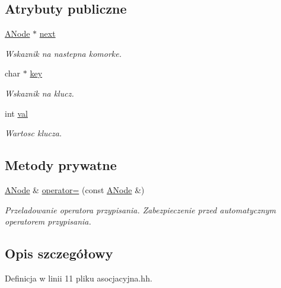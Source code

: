 \subsection*{Atrybuty publiczne}
\begin{DoxyCompactItemize}
\item 
\hyperlink{struct_a_node}{A\-Node} $\ast$ \hyperlink{struct_a_node_a97878d7354cd6beff5963e4fd0799805}{next}
\begin{DoxyCompactList}\small\item\em Wskaznik na nastepna komorke. \end{DoxyCompactList}\item 
char $\ast$ \hyperlink{struct_a_node_a3601f1eb35c094a209e3eab174f4afd4}{key}
\begin{DoxyCompactList}\small\item\em Wskaznik na klucz. \end{DoxyCompactList}\item 
int \hyperlink{struct_a_node_a4dbd8d8f9c7082fef7bc7f9113163301}{val}
\begin{DoxyCompactList}\small\item\em Wartosc klucza. \end{DoxyCompactList}\end{DoxyCompactItemize}
\subsection*{Metody prywatne}
\begin{DoxyCompactItemize}
\item 
\hyperlink{struct_a_node}{A\-Node} \& \hyperlink{struct_a_node_a96160014f2ca78c2b7baf21051752dbc}{operator=} (const \hyperlink{struct_a_node}{A\-Node} \&)
\begin{DoxyCompactList}\small\item\em Przeladowanie operatora przypisania. Zabezpieczenie przed automatycznym operatorem przypisania. \end{DoxyCompactList}\end{DoxyCompactItemize}


\subsection{Opis szczegółowy}


Definicja w linii 11 pliku asocjacyjna.\-hh.



